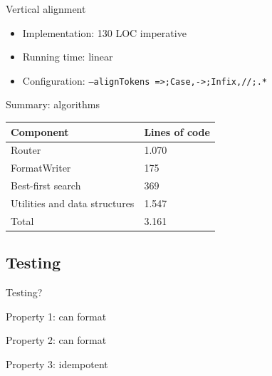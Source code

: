 \documentclass[xcolor=dvipsnames]{beamer}
\theoremstyle{definition}
\begin{document}
%   

\begin{frame}{Vertical alignment}
  \begin{itemize}
    \item Implementation: 130 LOC imperative
    \item Running time: linear
    \item Configuration: \texttt{--alignTokens =>;Case,->;Infix,//;.*}
  \end{itemize}
  
\end{frame}

\begin{frame}{Summary: algorithms}
  \begin{table}[H]
    \centering
    \label{}
    \begin{tabular}{ll}
      Component & Lines of code \\
      \hline \hline
      Router & 1.070 \\
      FormatWriter & 175 \\
      Best-first search & 369 \\
      Utilities and data structures & 1.547 \\
      \hline
      Total & 3.161
    \end{tabular}
  \end{table}
\end{frame}

\subsection{Testing}

\begin{frame}{}
  \begin{center}
    \Huge Testing?
  \end{center}
\end{frame}

\begin{frame}{Property 1: can format}
  
\end{frame}

\begin{frame}{Property 2: can format}
  
\end{frame}

\begin{frame}{Property 3: idempotent}
  
\end{frame}
\end{document}
